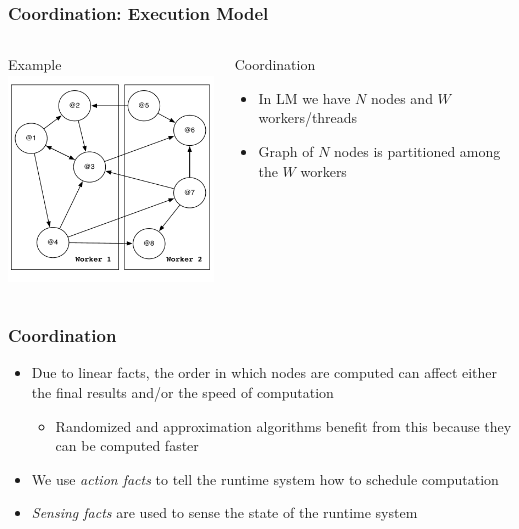\documentclass{beamer}
\begin{document}
\begin{frame}[fragile]
   \frametitle{Coordination: Execution Model}
   \begin{columns}[t]
          \begin{block}{Example}
             \includegraphics[height=5.5cm]{graph_coordination.pdf}
          \end{block}
          \begin{block}{Coordination}
             {\small
             \begin{itemize}
                \item In LM we have $N$ nodes and $W$ workers/threads
                \item Graph of $N$ nodes is partitioned among the $W$ workers
             \end{itemize}
             }
          \end{block}
   \end{columns}
\end{frame}

\begin{frame}[fragile]
   \frametitle{Coordination}
   \begin{itemize}
      \item Due to linear facts, the order in which nodes are computed can affect either the final results and/or the speed of computation
      \begin{itemize}
         \item Randomized and approximation algorithms benefit from this because they can be computed faster
      \end{itemize}
      \item We use \emph{action facts} to tell the runtime system how to schedule computation
      \item \emph{Sensing facts} are used to sense the state of the runtime system
   \end{itemize}
\end{frame}
\end{document}
